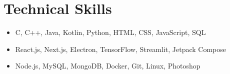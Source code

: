 \section{Technical Skills}
\begin{itemize}[leftmargin=0.15in, label={}, itemsep=0pt, parsep=1pt]
    \small
    \item {}C, C++, Java, Kotlin, Python, HTML, CSS, JavaScript, SQL
    \item {}React.js, Next.js, Electron, TensorFlow, Streamlit, Jetpack Compose
    \item {}Node.js, MySQL, MongoDB, Docker, Git, Linux, Photoshop
\end{itemize}